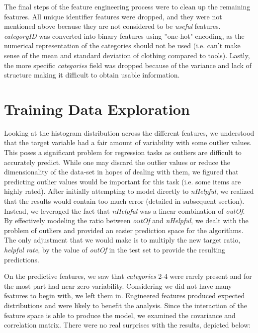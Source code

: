 \documentclass[12pt]{article}
\theoremstyle{plain}
\theoremstyle{definition}
\numberwithin{equation}{theorem}
\begin{document}
\bigskip
The final steps of the feature engineering process were to clean up the remaining features. All unique identifier features were dropped, and they were not mentioned above because they are not considered to be \textit{useful} features. \textit{categoryID} was converted into binary features using ''one-hot" encoding, as the numerical representation of the categories should not be used (i.e. can't make sense of the mean and standard deviation of clothing compared to tools). Lastly, the more specific \textit{categories} field was dropped because of the variance and lack of structure making it difficult to obtain usable information.

\section{Training Data Exploration}

Looking at the histogram distribution across the different features, we understood that the target variable had a fair amount of variability with some outlier values. This poses a significant problem for regression tasks as outliers are difficult to accurately predict. While one may discard the outlier values or reduce the dimensionality of the data-set in hopes of dealing with them, we figured that predicting outlier values would be important for this task (i.e. some items are highly rated). After initially attempting to model directly to \textit{nHelpful}, we realized that the results would contain too much error (detailed in subsequent section). Instead, we leveraged the fact that \textit{nHelpful} was a linear combination of \textit{outOf}. By effectively modeling the ratio between \textit{outOf} and \textit{nHelpful}, we dealt with the problem of outliers and provided an easier prediction space for the algorithms. The only adjustment that we would make is to multiply the new target ratio, \textit{helpful rate}, by the value of \textit{outOf} in the test set to provide the resulting predictions.

\bigskip
On the predictive features, we saw that \textit{categories} 2-4 were rarely present and for the most part had near zero variability. Considering we did not have many features to begin with, we left them in. Engineered features produced expected distributions and were likely to benefit the analysis. Since the interaction of the feature space is able to produce the model, we examined the covariance and correlation matrix. There were no real surprises with the results, depicted below:
\bigskip
\end{document}
